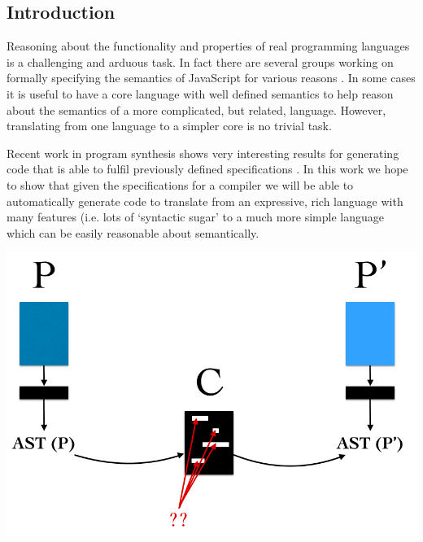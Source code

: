 \documentclass[twoside]{article}
\begin{document}
\begin{multicols}{2} %


\section{Introduction}
Reasoning about the functionality and properties of real programming
languages is a challenging and arduous task. In fact there are several
groups working on formally specifying the semantics of JavaScript for
various reasons \cite{js,ljs}. In some cases it is useful to have a
core language with well defined semantics to help reason about the
semantics of a more complicated, but related, language. However,
translating from one language to a simpler core is no trivial task.

Recent work in program synthesis shows very interesting results for
generating code that is able to fulfil previously defined
specifications \cite{flash,invert,sygus,feedback,sketch}. In this work
we hope to show that given the specifications for a compiler we will
be able to automatically generate code to translate from an
expressive, rich language with many features (i.e. lots of `syntactic
sugar' to a much more simple language which can be easily reasonable
about semantically. 


\includegraphics[width=\linewidth]{images/overview.png}
\label{fig:overview}


\end{multicols}
\end{document}
